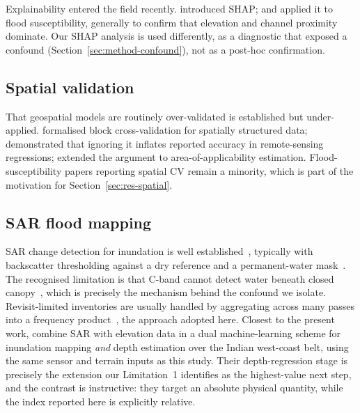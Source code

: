 \documentclass[11pt,a4paper]{article}
\begin{document}
Explainability entered the field recently. \citet{lundberg2017} introduced SHAP;
\citet{aydin2022} and \citet{seydi2023} applied it to flood susceptibility,
generally to confirm that elevation and channel proximity dominate. Our SHAP
analysis is used differently, as a diagnostic that exposed a confound
(Section~\ref{sec:method-confound}), not as a post-hoc confirmation.

\subsection{Spatial validation}
That geospatial models are routinely over-validated is established but
under-applied. \citet{roberts2017} formalised block cross-validation for
spatially structured data; \citet{ploton2020} demonstrated that ignoring it
inflates reported accuracy in remote-sensing regressions; \citet{meyer2021}
extended the argument to area-of-applicability estimation. Flood-susceptibility
papers reporting spatial CV remain a minority, which is part of the motivation
for Section~\ref{sec:res-spatial}.

\subsection{SAR flood mapping}
SAR change detection for inundation is well established~\citep{martinis2009,
twele2016,shen2019}, typically with backscatter thresholding against a dry
reference and a permanent-water mask~\citep{pekel2016}. The recognised limitation
is that C-band cannot detect water beneath closed
canopy~\citep{townsend2002,tsyganskaya2018}, which is precisely the mechanism
behind the confound we isolate. Revisit-limited inventories are usually handled
by aggregating across many passes into a frequency
product~\citep{pekel2016,donchyts2016}, the approach adopted here.
Closest to the present work, \citet{sadhwani2026} combine SAR with elevation data
in a dual machine-learning scheme for inundation mapping \emph{and} depth
estimation over the Indian west-coast belt, using the same sensor and terrain
inputs as this study. Their depth-regression stage is precisely the extension our
Limitation~1 identifies as the highest-value next step, and the contrast is
instructive: they target an absolute physical quantity, while the index reported
here is explicitly relative.
\end{document}
